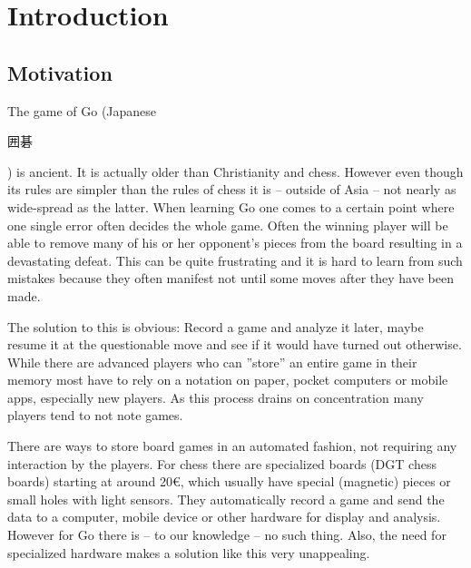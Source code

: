 
\chapter{Introduction}
	\section{Motivation}
	\label{introduction-motivation}
	The game of Go (Japanese \begingroup\setmainfont{Droid Sans Japanese}\small\begin{CJK}{UTF8}{min}囲碁\end{CJK}\endgroup ) is ancient. It is actually older than Christianity and chess. However even though its rules are simpler than the rules of chess it is -- outside of Asia -- not nearly as wide-spread as the latter. When learning Go one comes to a certain point where one single error often decides the whole game. Often the winning player will be able to remove many of his or her opponent's pieces from the board resulting in a devastating defeat. This can be quite frustrating and it is hard to learn from such mistakes because they often manifest not until some moves after they have been made.

	The solution to this is obvious: Record a game and analyze it later, maybe resume it at the questionable move and see if it would have turned out otherwise. While there are advanced players who can ''store'' an entire game in their memory most have to rely on a notation on paper, pocket computers or mobile apps, especially new players. As this process drains on concentration many players tend to not note games.

	There are ways to store board games in an automated fashion, not requiring any interaction by the players. For chess there are specialized boards (DGT chess boards) starting at around 20€, which usually have special (magnetic) pieces\cite{bulsink2001device} or small holes with light sensors. They automatically record a game and send the data to a computer, mobile device or other hardware for display and analysis. However for Go there is -- to our knowledge -- no such thing. Also, the need for specialized hardware makes a solution like this very unappealing.

